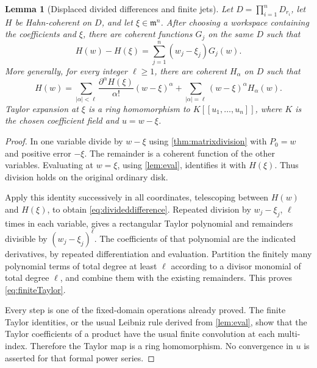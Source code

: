 \documentclass[11pt,oneside]{article}
\numberwithin{equation}{section}
\newtheorem{lemma}[theorem]{Lemma}
\theoremstyle{definition}
\theoremstyle{remark}\newtheorem{remark}[theorem]{Remark}
\newcommand{\mm}{\mathfrak m}
\begin{document}
\begin{lemma}[Displaced divided differences and finite jets]\label{lem:finitejet}
Let \(D=\prod_{i=1}^nD_{r_i}\), let \(H\) be Hahn-coherent on \(D\), and let \(\xi\in\mm^n\). After choosing a workspace containing the coefficients and \(\xi\), there are coherent functions \(G_j\) on the same \(D\) such that
\begin{equation}\label{eq:divideddifference}
 H(w)-H(\xi)=\sum_{j=1}^n(w_j-\xi_j)G_j(w).
\end{equation}
More generally, for every integer \(\ell\geq1\), there are coherent \(H_\alpha\) on \(D\) such that
\begin{equation}\label{eq:finiteTaylor}
 H(w)=\sum_{|\alpha|<\ell}
 \frac{\partial^\alpha H(\xi)}{\alpha!}(w-\xi)^\alpha
 +\sum_{|\alpha|=\ell}(w-\xi)^\alpha H_\alpha(w).
\end{equation}
Taylor expansion at \(\xi\) is a ring homomorphism to \(K[[u_1,\ldots,u_n]]\), where \(K\) is the chosen coefficient field and \(u=w-\xi\).
\end{lemma}
\begin{proof}
In one variable divide by \(w-\xi\) using \cref{thm:matrixdivision} with \(P_0=w\) and positive error \(-\xi\). The remainder is a coherent function of the other variables. Evaluating at \(w=\xi\), using \cref{lem:eval}, identifies it with \(H(\xi)\). Thus division holds on the original ordinary disk.

Apply this identity successively in all coordinates, telescoping between \(H(w)\) and \(H(\xi)\), to obtain \eqref{eq:divideddifference}. Repeated division by \(w_j-\xi_j\), \(\ell\) times in each variable, gives a rectangular Taylor polynomial and remainders divisible by \((w_j-\xi_j)^\ell\). The coefficients of that polynomial are the indicated derivatives, by repeated differentiation and evaluation. Partition the finitely many polynomial terms of total degree at least \(\ell\) according to a divisor monomial of total degree \(\ell\), and combine them with the existing remainders. This proves \eqref{eq:finiteTaylor}.

Every step is one of the fixed-domain operations already proved. The finite Taylor identities, or the usual Leibniz rule derived from \cref{lem:eval}, show that the Taylor coefficients of a product have the usual finite convolution at each multi-index. Therefore the Taylor map is a ring homomorphism. No convergence in \(u\) is asserted for that formal power series.
\end{proof}
\end{document}

